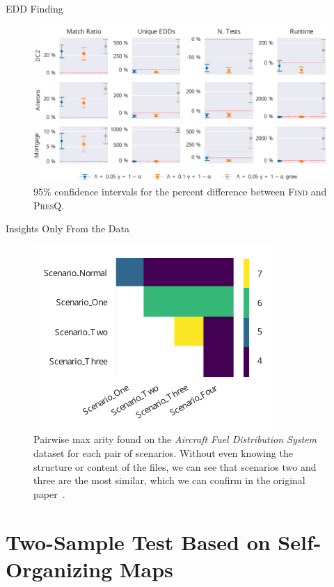 \documentclass[10pt,notes]{beamer}
\newcommand{\PresQ}[0]{\textsc{PresQ}\xspace}
\begin{document}
\begin{frame}{EDD Finding}
\begin{figure}
    \centering
    \includegraphics[width=\textwidth]{all}
    \caption{$95\%$ confidence intervals for the percent difference
    between \textsc{Find} and \PresQ.}
\end{figure}

\end{frame}

\begin{frame}{Insights Only From the Data}
\begin{figure}
    \centering
    \includegraphics{afds}
    \caption{
        Pairwise max arity found on the \emph{Aircraft Fuel Distribution System} dataset for each pair of scenarios.
        Without even knowing the structure or content of the files, we can see that
        scenarios two and three are the most similar, which we can confirm in the
        original paper~\cite{Gheraibia2019}.
    }
\end{figure}
\end{frame}

\section{Two-Sample Test Based on Self-Organizing Maps}
\end{document}
